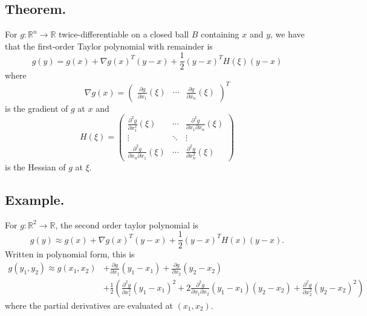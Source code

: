 \documentclass[titlepage]{article}
\begin{document}
\subsection{Theorem.} For $g: \mathbb{R}^{n} \to \mathbb{R}$ twice-differentiable on a closed ball $B$ containing $x$ and $y$, we have that the first-order Taylor polynomial with remainder is 
$$g(y) = g(x) + \nabla g(x)^{T}(y-x) + \frac{1}{2}(y-x)^{T}H(\xi)(y-x)$$
where 
$$\nabla g(x) = \begin{pmatrix} \frac{\partial g}{\partial x_{1}}(\xi) & \cdots & \frac{\partial g}{\partial x_{n}}(\xi) \end{pmatrix}^{T}$$
is the gradient of $g$ at $x$ and 
$$H(\xi) = \begin{pmatrix} \frac{\partial^{2} g}{\partial x_{1}^{2}}(\xi) & \cdots & \frac{\partial^{2} g}{\partial x_{1}\partial x_{n}}(\xi) \\ \vdots & \ddots & \vdots \\ \frac{\partial^{2} g}{\partial x_{n}\partial x_{1}}(\xi) & \cdots & \frac{\partial^{2} g}{\partial x_{n}^{2}}(\xi) \end{pmatrix}$$
is the Hessian of $g$ at $\xi$.

\subsection{Example.} For $g: \mathbb{R}^{2} \to \mathbb{R}$, the second order taylor polynomial is 
$$g(y) \approx g(x) + \nabla g(x)^{T}(y-x) + \frac{1}{2}(y-x)^{T}H(x)(y-x).$$
Written in polynomial form, this is 
\begin{align*}
    g(y_{1}, y_{2}) \approx g(x_{1}, x_{2}) &+ \frac{\partial g}{\partial x_{1}}(y_{1}-x_{1}) + \frac{\partial g}{\partial x_{2}}(y_{2}-x_{2}) \\
                                            &+ \frac{1}{2}\left(\frac{\partial^{2} g}{\partial x_{1}^{2}}(y_{1}-x_{1})^{2} + 2\frac{\partial^{2} g}{\partial x_{1}\partial x_{2}}(y_{1}-x_{1})(y_{2}-x_{2}) + \frac{\partial^{2} g}{\partial x_{2}^{2}}(y_{2}-x_{2})^{2}\right)
\end{align*}
where the partial derivatives are evaluated at $(x_{1}, x_{2})$.
\end{document}

